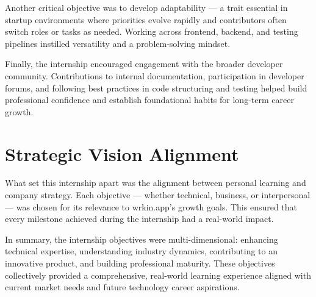 Another critical objective was to develop adaptability — a trait essential in startup environments where priorities evolve rapidly and contributors often switch roles or tasks as needed. Working across frontend, backend, and testing pipelines instilled versatility and a problem-solving mindset.

Finally, the internship encouraged engagement with the broader developer community. Contributions to internal documentation, participation in developer forums, and following best practices in code structuring and testing helped build professional confidence and establish foundational habits for long-term career growth.

\section{Strategic Vision Alignment}

What set this internship apart was the alignment between personal learning and company strategy. Each objective — whether technical, business, or interpersonal — was chosen for its relevance to wrkin.app's growth goals. This ensured that every milestone achieved during the internship had a real-world impact.

In summary, the internship objectives were multi-dimensional: enhancing technical expertise, understanding industry dynamics, contributing to an innovative product, and building professional maturity. These objectives collectively provided a comprehensive, real-world learning experience aligned with current market needs and future technology career aspirations.
